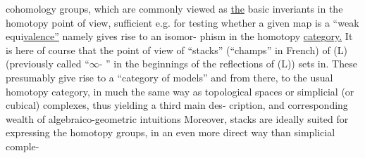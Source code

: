 cohomology groups, which are commonly viewed as \uline{the} basic inveriants
in the homotopy point of view, sufficient e.g. for testing whether a
given map  is a ``weak equi\uline{valence''} namely gives rise to an isomor-%
phism in the homotopy \uline{category.}\hand{||}\margin{$\lrcorner$||} It is here of course that the point of
view of ``stacks'' (``champs'' in French) of (L) (previously called ``$\infty$-
'' in the beginnings of the reflections of (L)) sets in. These
presumably give rise to a ``category of models'' and from there, to the
usual homotopy category, in much the same way as topological spaces
or simplicial (or cubical) complexes, thus yielding a third main des-%
cription, and corresponding wealth of algebraico-geometric intuitions
 Moreover, stacks are ideally suited for expressing
the homotopy groups, in an even more direct way than simplicial comple-%
